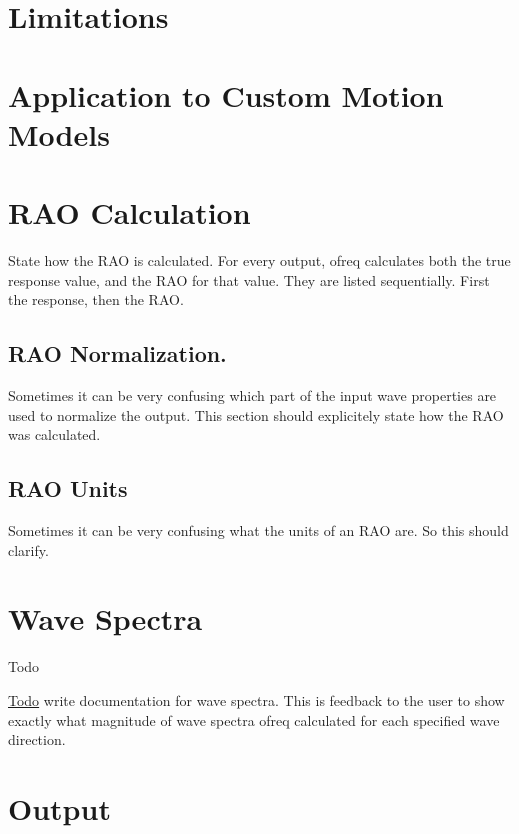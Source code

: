 \section*{Limitations}

\section*{Application to Custom Motion Models}

\section*{R\-A\-O Calculation}

State how the R\-A\-O is calculated. For every output, ofreq calculates both the true response value, and the R\-A\-O for that value. They are listed sequentially. First the response, then the R\-A\-O.

\subsection*{R\-A\-O Normalization.}

Sometimes it can be very confusing which part of the input wave properties are used to normalize the output. This section should explicitely state how the R\-A\-O was calculated.

\subsection*{R\-A\-O Units}

Sometimes it can be very confusing what the units of an R\-A\-O are. So this should clarify. \hypertarget{output_wave_spectra}{}\section{Wave Spectra}\label{output_wave_spectra}
\begin{DoxyRefDesc}{Todo}
\item[\hyperlink{todo__todo000033}{Todo}]write documentation for wave spectra. This is feedback to the user to show exactly what magnitude of wave spectra ofreq calculated for each specified wave direction.\end{DoxyRefDesc}


\section*{Output}

